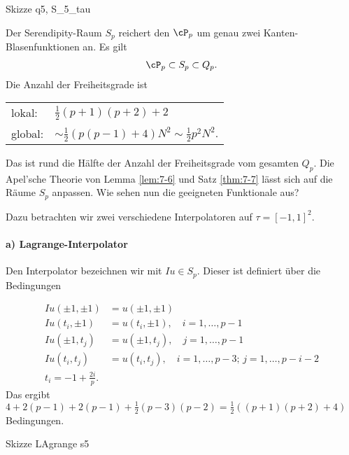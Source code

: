 Skizze q5, S\_5\_tau

Der Serendipity-Raum $S_{p}$ reichert den $\cP_{p}$ um genau zwei Kanten-Blasenfunktionen an. Es gilt
\begin{align*}
  \cP_{p} \subset S_{p} \subset Q_{p}. 
\end{align*}
Die Anzahl der Freiheitsgrade ist

\begin{tabular}[ht!]{l l}
  lokal: & $\frac 12 (p+1)(p+2) + 2$\\
  global: & $\sim \frac 12 (p(p-1) +4)N^{2} \sim \frac 12 p^{2} N^{2}$.  
\end{tabular}

Das ist rund die Hälfte der Anzahl der Freiheitsgrade vom gesamten $Q_{p}$. Die Apel'sche Theorie von Lemma \ref{lem:7-6} und Satz \ref{thm:7-7} lässt sich auf die Räume $S_{p}$ anpassen. Wie sehen nun die geeigneten Funktionale aus?

Dazu betrachten wir zwei verschiedene Interpolatoren auf $\tau = [-1, 1]^{2}$. 

\paragraph{a) Lagrange-Interpolator}
\label{sec:lagr-interp}

Den Interpolator bezeichnen wir mit $Iu \in S_{p}$. Dieser ist definiert über die Bedingungen 

\begin{align*}
Iu (\pm 1, \pm 1) &= u(\pm 1, \pm1)\\
Iu (t_{i}, \pm 1) &= u(t_{i}, \pm1), \quad i = 1, \dots, p-1\\
Iu (\pm 1, t_{j}) &= u(\pm 1, t_{j}), \quad j = 1, \dots, p-1\\
Iu (t_{i}, t_{j}) &= u(t_{i}, t_{j}), \quad i = 1, \dots, p-3; \, j = 1, \dots, p-i-2\\
t_{i} = -1 + \frac {2i}p. 
\end{align*}
Das ergibt $4 + 2(p-1)+ 2(p-1)+ \frac 12 (p-3)(p-2) = \frac 12 ((p+1)(p+2) +4)$ Bedingungen. 

Skizze LAgrange s5


